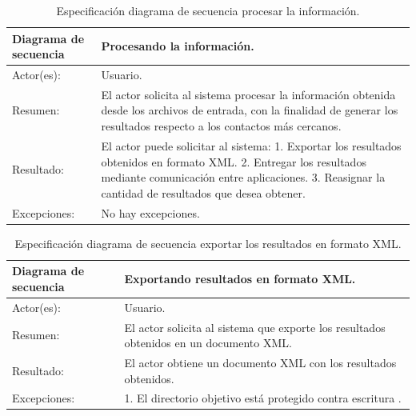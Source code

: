 \begin{table}[H]
\begin{center}
\caption[Especificación diagrama de secuencia procesar la información.]{Especificación diagrama de secuencia procesar la información.}
\label{tab:des-tab15}
\begin{tabular}{|l|>{\raggedright}p{7cm}|}
\hline 
Diagrama de secuencia & Procesando la información.\tabularnewline
\hline 
\hline 
Actor(es): & Usuario.\tabularnewline
\hline 
Resumen: & El actor solicita al sistema procesar la información obtenida desde los archivos de entrada, con la finalidad de generar los resultados respecto a los contactos más cercanos.\tabularnewline
\hline 
Resultado: & El actor puede solicitar al sistema: 
1. Exportar los resultados obtenidos en formato XML. 
2. Entregar los resultados mediante comunicación entre aplicaciones.
3. Reasignar la cantidad de resultados que desea obtener.\tabularnewline
\hline 
Excepciones: & No hay excepciones.\tabularnewline
\hline 
\end{tabular}
\end{center}
\end{table}

\begin{table}[H]
\begin{center}
\caption[Especificación diagrama de secuencia exportar los resultados en formato XML.]{Especificación diagrama de secuencia exportar los resultados en formato XML.}
\label{tab:des-tab16}
\begin{tabular}{|l|>{\raggedright}p{7cm}|}
\hline 
Diagrama de secuencia & Exportando resultados en formato XML.\tabularnewline
\hline 
\hline 
Actor(es): & Usuario.\tabularnewline
\hline 
Resumen: & El actor solicita al sistema que exporte los resultados obtenidos en un documento XML.\tabularnewline
\hline 
Resultado: & El actor obtiene un documento XML con los resultados obtenidos.\tabularnewline
\hline 
Excepciones: & 1. El directorio objetivo está protegido contra escritura .\tabularnewline
\hline 
\end{tabular}
\end{center}
\end{table}

